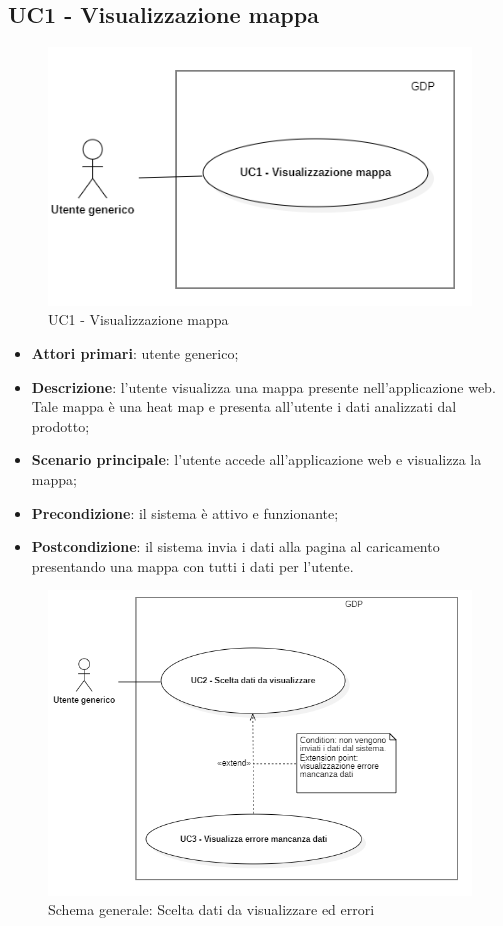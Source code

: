 \subsection{UC1 - Visualizzazione mappa}
\begin{center}
	\begin{figure}[H]
		\includegraphics[width=0.95\linewidth]{../immagini/attori_casi/vis_mappa.png}
		\caption{UC1 - Visualizzazione mappa}
	\end{figure}
\end{center}
\begin{itemize}
	\item \textbf{Attori primari}: utente generico;
	\item \textbf{Descrizione}: l'utente visualizza una mappa presente nell'applicazione web. Tale mappa è una heat map e presenta all'utente i dati analizzati dal prodotto;
	\item \textbf{Scenario principale}: l'utente accede all'applicazione web e visualizza la mappa;
	\item \textbf{Precondizione}: il sistema è attivo e funzionante;
	\item \textbf{Postcondizione}: il sistema invia i dati alla pagina al caricamento presentando una mappa con tutti i dati per l'utente.
\end{itemize}
\begin{center}
	\begin{figure}[H]
		\includegraphics[width=0.95\linewidth]{../immagini/attori_casi/uc2.png}
		\caption{Schema generale: Scelta dati da visualizzare ed errori}
	\end{figure}
\end{center}


